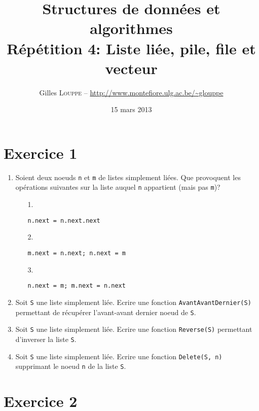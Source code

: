 \documentclass[a4paper,10pt]{article}
\title{
    \textbf{Structures de données et algorithmes}\\
    Répétition 4: Liste liée, pile, file et vecteur
}
\author{Gilles \textsc{Louppe} -- \url{http://www.montefiore.ulg.ac.be/~glouppe}}
\date{15 mars 2013}
\begin{document}
\maketitle

\section*{Exercice 1}

\begin{enumerate}

\item Soient deux noeuds \texttt{n} et \texttt{m} de listes simplement liées. Que provoquent les opérations suivantes sur la liste auquel \texttt{n} appartient (mais pas \texttt{m})?

\begin{itemize}

\item[1.]
\begin{verbatim}
n.next = n.next.next
\end{verbatim}

\item[2.]
\begin{verbatim}
m.next = n.next; n.next = m
\end{verbatim}

\item[3.]
\begin{verbatim}
n.next = m; m.next = n.next
\end{verbatim}

\end{itemize}

\item Soit \texttt{S} une liste simplement liée. Ecrire une fonction \texttt{AvantAvantDernier(S)} permettant de récupérer l'avant-avant dernier noeud de \texttt{S}.

\item Soit \texttt{S} une liste simplement liée. Ecrire une fonction \texttt{Reverse(S)} permettant d'inverser la liste \texttt{S}.

\item Soit \texttt{S} une liste simplement liée. Ecrire une fonction \texttt{Delete(S, n)} supprimant le noeud \texttt{n} de la liste \texttt{S}.

\end{enumerate}

\section*{Exercice 2}
\end{document}
